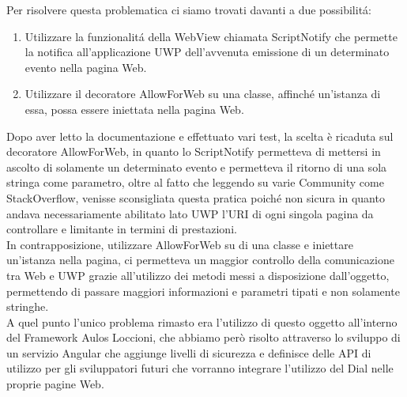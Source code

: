 Per risolvere questa problematica ci siamo trovati davanti a due possibilitá:

\begin{enumerate}
\item Utilizzare la funzionalitá della WebView chiamata ScriptNotify che permette la notifica all'applicazione UWP dell'avvenuta emissione di un determinato evento nella pagina Web.
\item Utilizzare il decoratore AllowForWeb su una classe, affinché un'istanza di essa, possa essere iniettata nella pagina Web.
\end{enumerate}

Dopo aver letto la documentazione e effettuato vari test, la scelta è ricaduta sul decoratore AllowForWeb, in quanto lo ScriptNotify permetteva di mettersi in ascolto di solamente un determinato evento e permetteva il ritorno di una sola stringa come parametro, oltre al fatto che leggendo su varie Community come StackOverflow, venisse sconsigliata questa pratica poiché non sicura in quanto andava necessariamente abilitato lato UWP l'URI di ogni singola pagina da controllare e limitante in termini di prestazioni.\\ 

In contrapposizione, utilizzare AllowForWeb su di una classe e iniettare un'istanza nella pagina, ci permetteva un maggior controllo della comunicazione tra Web e UWP grazie all'utilizzo dei metodi messi a disposizione dall'oggetto, permettendo di passare maggiori informazioni e parametri tipati e non solamente stringhe.\\ 

A quel punto l’unico problema rimasto era l’utilizzo di questo oggetto all’interno del Framework Aulos Loccioni, che abbiamo però risolto attraverso lo sviluppo di un servizio Angular che aggiunge livelli di sicurezza e definisce delle API di utilizzo per gli sviluppatori futuri che vorranno integrare l'utilizzo del Dial nelle proprie pagine Web.










